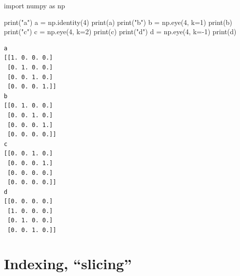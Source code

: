 \documentclass[
  english,
  letterpaper,
  DIV=11,
  numbers=noendperiod]{scrreprt}
\newenvironment{Shaded}{\begin{snugshade}}{\end{snugshade}}
\newcommand{\BuiltInTok}[1]{\textcolor[rgb]{0.00,0.23,0.31}{#1}}
\newcommand{\DecValTok}[1]{\textcolor[rgb]{0.68,0.00,0.00}{#1}}
\newcommand{\ImportTok}[1]{\textcolor[rgb]{0.00,0.46,0.62}{#1}}
\newcommand{\NormalTok}[1]{\textcolor[rgb]{0.00,0.23,0.31}{#1}}
\newcommand{\OperatorTok}[1]{\textcolor[rgb]{0.37,0.37,0.37}{#1}}
\newcommand{\StringTok}[1]{\textcolor[rgb]{0.13,0.47,0.30}{#1}}
\begin{document}
\begin{Shaded}
\begin{Highlighting}[]
\ImportTok{import}\NormalTok{ numpy }\ImportTok{as}\NormalTok{ np}

\BuiltInTok{print}\NormalTok{(}\StringTok{"a"}\NormalTok{)}
\NormalTok{a }\OperatorTok{=}\NormalTok{ np.identity(}\DecValTok{4}\NormalTok{)}
\BuiltInTok{print}\NormalTok{(a)}
\BuiltInTok{print}\NormalTok{(}\StringTok{"b"}\NormalTok{)}
\NormalTok{b }\OperatorTok{=}\NormalTok{ np.eye(}\DecValTok{4}\NormalTok{, k}\OperatorTok{=}\DecValTok{1}\NormalTok{)}
\BuiltInTok{print}\NormalTok{(b)}
\BuiltInTok{print}\NormalTok{(}\StringTok{"c"}\NormalTok{)}
\NormalTok{c }\OperatorTok{=}\NormalTok{ np.eye(}\DecValTok{4}\NormalTok{, k}\OperatorTok{=}\DecValTok{2}\NormalTok{)}
\BuiltInTok{print}\NormalTok{(c)}
\BuiltInTok{print}\NormalTok{(}\StringTok{"d"}\NormalTok{)}
\NormalTok{d }\OperatorTok{=}\NormalTok{ np.eye(}\DecValTok{4}\NormalTok{, k}\OperatorTok{={-}}\DecValTok{1}\NormalTok{)}
\BuiltInTok{print}\NormalTok{(d)}
\end{Highlighting}
\end{Shaded}

\begin{verbatim}
a
[[1. 0. 0. 0.]
 [0. 1. 0. 0.]
 [0. 0. 1. 0.]
 [0. 0. 0. 1.]]
b
[[0. 1. 0. 0.]
 [0. 0. 1. 0.]
 [0. 0. 0. 1.]
 [0. 0. 0. 0.]]
c
[[0. 0. 1. 0.]
 [0. 0. 0. 1.]
 [0. 0. 0. 0.]
 [0. 0. 0. 0.]]
d
[[0. 0. 0. 0.]
 [1. 0. 0. 0.]
 [0. 1. 0. 0.]
 [0. 0. 1. 0.]]
\end{verbatim}

\chapter{Indexing, ``slicing''}\label{indexing-slicing}
\end{document}
